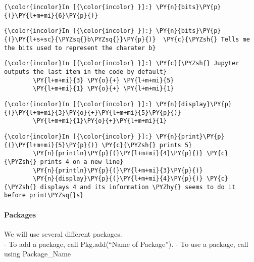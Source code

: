     \begin{Verbatim}[commandchars=\\\{\}]
{\color{incolor}In [{\color{incolor} }]:} \PY{n}{bits}\PY{p}{(}\PY{l+m+mi}{6}\PY{p}{)}
\end{Verbatim}


    \begin{Verbatim}[commandchars=\\\{\}]
{\color{incolor}In [{\color{incolor} }]:} \PY{n}{bits}\PY{p}{(}\PY{l+s+sc}{\PYZsq{}b\PYZsq{}}\PY{p}{)}  \PY{c}{\PYZsh{} Tells me the bits used to represent the charater b}
\end{Verbatim}


    \begin{Verbatim}[commandchars=\\\{\}]
{\color{incolor}In [{\color{incolor} }]:} \PY{c}{\PYZsh{} Jupyter outputs the last item in the code by default}
        \PY{l+m+mi}{3} \PY{o}{+} \PY{l+m+mi}{5}
        \PY{l+m+mi}{1} \PY{o}{+} \PY{l+m+mi}{1}
\end{Verbatim}


    \begin{Verbatim}[commandchars=\\\{\}]
{\color{incolor}In [{\color{incolor} }]:} \PY{n}{display}\PY{p}{(}\PY{l+m+mi}{3}\PY{o}{+}\PY{l+m+mi}{5}\PY{p}{)}
        \PY{l+m+mi}{1}\PY{o}{+}\PY{l+m+mi}{1}
\end{Verbatim}


    \begin{Verbatim}[commandchars=\\\{\}]
{\color{incolor}In [{\color{incolor} }]:} \PY{n}{print}\PY{p}{(}\PY{l+m+mi}{5}\PY{p}{)} \PY{c}{\PYZsh{} prints 5}
        \PY{n}{println}\PY{p}{(}\PY{l+m+mi}{4}\PY{p}{)} \PY{c}{\PYZsh{} prints 4 on a new line}
        \PY{n}{println}\PY{p}{(}\PY{l+m+mi}{3}\PY{p}{)}
        \PY{n}{display}\PY{p}{(}\PY{l+m+mi}{4}\PY{p}{)} \PY{c}{\PYZsh{} displays 4 and its information \PYZhy{} seems to do it before print\PYZsq{}s}
\end{Verbatim}


    \hypertarget{packages}{%
\paragraph{Packages}
\label{packages}}

We will use several different packages.\\
- To add a package, call Pkg.add(``Name of Package''). - To use a
package, call using Package\_Name

